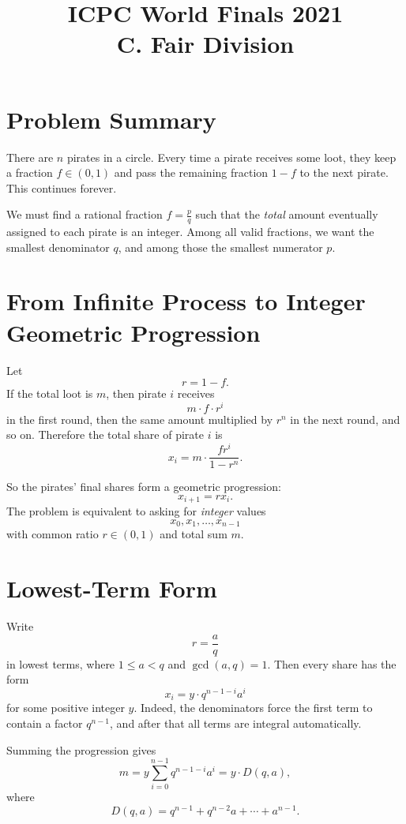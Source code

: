 \documentclass[11pt]{article}
\title{ICPC World Finals 2021\\C. Fair Division}
\author{}
\date{}
\begin{document}
\maketitle

\section*{Problem Summary}

There are $n$ pirates in a circle. Every time a pirate receives some loot, they keep a fraction
$f \in (0,1)$ and pass the remaining fraction $1-f$ to the next pirate. This continues forever.

We must find a rational fraction $f = \frac{p}{q}$ such that the \emph{total} amount eventually assigned to
each pirate is an integer. Among all valid fractions, we want the smallest denominator $q$, and among those
the smallest numerator $p$.

\section*{From Infinite Process to Integer Geometric Progression}

Let
\[
    r = 1 - f.
\]
If the total loot is $m$, then pirate $i$ receives
\[
    m \cdot f \cdot r^i
\]
in the first round, then the same amount multiplied by $r^n$ in the next round, and so on. Therefore the
total share of pirate $i$ is
\[
    x_i = m \cdot \frac{f r^i}{1-r^n}.
\]

So the pirates' final shares form a geometric progression:
\[
    x_{i+1} = r x_i.
\]
The problem is equivalent to asking for \emph{integer} values
\[
    x_0, x_1, \dots, x_{n-1}
\]
with common ratio $r \in (0,1)$ and total sum $m$.

\section*{Lowest-Term Form}

Write
\[
    r = \frac{a}{q}
\]
in lowest terms, where $1 \le a < q$ and $\gcd(a,q)=1$. Then every share has the form
\[
    x_i = y \cdot q^{n-1-i} a^i
\]
for some positive integer $y$. Indeed, the denominators force the first term to contain a factor
$q^{n-1}$, and after that all terms are integral automatically.

Summing the progression gives
\[
    m
    = y \sum_{i=0}^{n-1} q^{n-1-i} a^i
    = y \cdot D(q,a),
\]
where
\[
    D(q,a) = q^{n-1} + q^{n-2}a + \cdots + a^{n-1}.
\]
\end{document}
